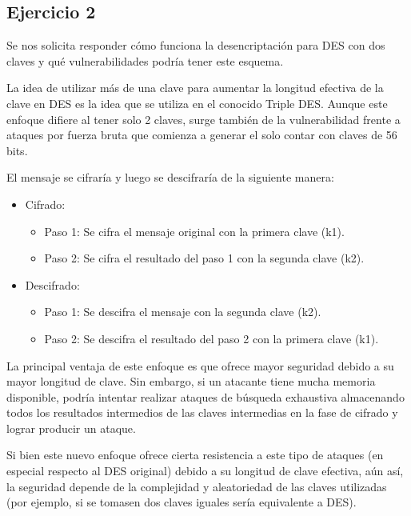 \documentclass[11pt]{article}
\begin{document}
\subsection*{Ejercicio 2}
Se nos solicita responder cómo funciona la desencriptación para DES con dos claves y 
qué vulnerabilidades podría tener este esquema.

La idea de utilizar más de una clave para aumentar la longitud efectiva de la clave en DES es la idea 
que se utiliza en el conocido Triple DES. Aunque este enfoque difiere
al tener solo 2 claves, surge también de la vulnerabilidad frente a ataques por fuerza bruta 
que comienza a generar el solo contar con claves de 56 bits.

El mensaje se cifraría y luego se descifraría de la siguiente manera:

\begin{itemize}
\item Cifrado:

\begin{itemize}
\item Paso 1: Se cifra el mensaje original con la primera clave (k1).
\item Paso 2: Se cifra el resultado del paso 1 con la segunda clave (k2).
\end{itemize}

\item Descifrado:

\begin{itemize}
\item Paso 1: Se descifra el mensaje con la segunda clave (k2).
\item Paso 2: Se descifra el resultado del paso 2 con la primera clave (k1).
\end{itemize}

\end{itemize}

La principal ventaja de este enfoque es que ofrece mayor seguridad debido a su mayor longitud de clave. 
Sin embargo, si un atacante tiene mucha memoria disponible, podría intentar realizar ataques de búsqueda exhaustiva 
almacenando todos los resultados intermedios de las claves intermedias en la fase de cifrado y lograr producir un ataque.

Si bien este nuevo enfoque ofrece cierta resistencia a este tipo de ataques (en especial respecto al DES original)
debido a su longitud de clave efectiva, 
aún así, la seguridad depende de la complejidad y aleatoriedad de las claves utilizadas (por ejemplo, si
se tomasen dos claves iguales sería equivalente a DES).
\end{document}
